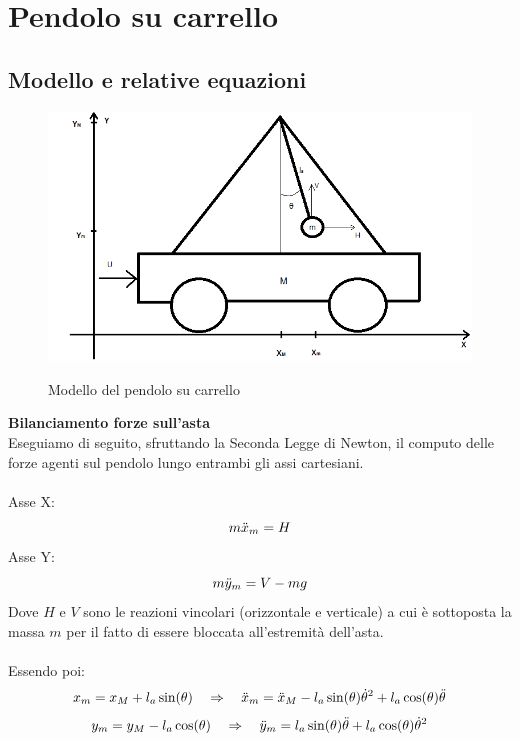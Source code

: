 \chapter{Pendolo su carrello}\label{PendCarrello}
\section{Modello e relative equazioni}\label{equazioni}
\begin{figure}[ht]
	\centering
	\includegraphics[width=\textwidth]{pendolo.png}\\
	\caption{Modello del pendolo su carrello}
	\label{pendolo}
\end{figure}
\textbf{Bilanciamento forze sull'asta}\\
Eseguiamo di seguito, sfruttando la Seconda Legge di Newton, il computo delle forze agenti sul pendolo lungo entrambi gli assi cartesiani.\\\\
Asse X:
\begin{equation}\notag
m\ddot{x}_m=H
\end{equation}
Asse Y:
\begin{equation}\notag
m\ddot{y}_m=V-mg
\end{equation}
Dove $H$ e $V$ sono le reazioni vincolari (orizzontale e verticale) a cui è sottoposta la massa $m$ per il fatto di essere bloccata all'estremità dell'asta.\\ \\
Essendo poi:\\
\begin{equation}\notag
x_m = x_M+l_a\sin(\theta) \quad \Rightarrow \quad \ddot{x}_m=\ddot{x}_M-l_a\sin(\theta)\dot{\theta}^2+l_a\cos(\theta)\ddot{\theta}
\end{equation}
\begin{equation}\notag
y_m=y_M-l_a\cos(\theta) \quad \Rightarrow \quad \ddot{y}_m=l_a\sin(\theta)\ddot{\theta}+l_a\cos(\theta)\dot{\theta}^2
\end{equation}
